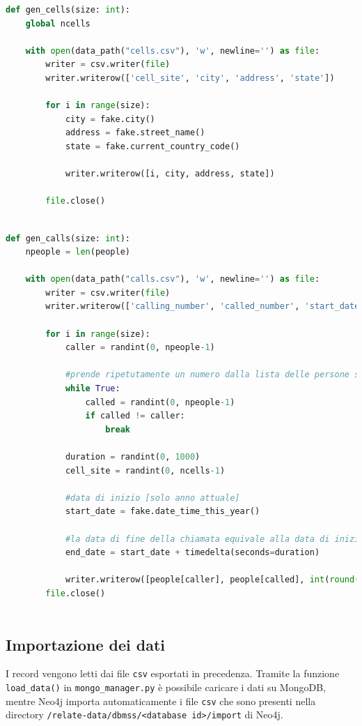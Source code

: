     \begin{lstlisting}[language=Python, caption=gen\_cells()]
def gen_cells(size: int):
    global ncells

    with open(data_path("cells.csv"), 'w', newline='') as file:
        writer = csv.writer(file)
        writer.writerow(['cell_site', 'city', 'address', 'state'])

        for i in range(size):
            city = fake.city()
            address = fake.street_name()
            state = fake.current_country_code()

            writer.writerow([i, city, address, state])

        file.close()
    
    \end{lstlisting}

    \pagebreak
    \begin{lstlisting}[language=Python, caption=gen\_calls()]
def gen_calls(size: int):
    npeople = len(people)

    with open(data_path("calls.csv"), 'w', newline='') as file:
        writer = csv.writer(file)
        writer.writerow(['calling_number', 'called_number', 'start_date', 'end_date', 'duration', 'cell_site'])

        for i in range(size):
            caller = randint(0, npeople-1)

            #prende ripetutamente un numero dalla lista delle persone se il numero del chiamante e' uguale a quello del chiamato
            while True:
                called = randint(0, npeople-1)
                if called != caller:
                    break

            duration = randint(0, 1000)
            cell_site = randint(0, ncells-1)

            #data di inizio [solo anno attuale]
            start_date = fake.date_time_this_year()

            #la data di fine della chiamata equivale alla data di inizio della chiamata + la durata(in secondi)
            end_date = start_date + timedelta(seconds=duration)

            writer.writerow([people[caller], people[called], int(round(datetime.timestamp(start_date))), int(round(datetime.timestamp(end_date))), duration, cell_site])
        file.close()
    
    \end{lstlisting}

    \pagebreak
    \subsection{Importazione dei dati}
    I record vengono letti dai file \texttt{csv} esportati in precedenza. Tramite
    la funzione \texttt{load\_data()} in \texttt{mongo\_manager.py} 
    è possibile caricare i dati su MongoDB, mentre Neo4j importa automaticamente i file \texttt{csv}
    che sono presenti nella directory \texttt{/relate-data/dbmss/<database id>/import} di Neo4j.
    \\ 

